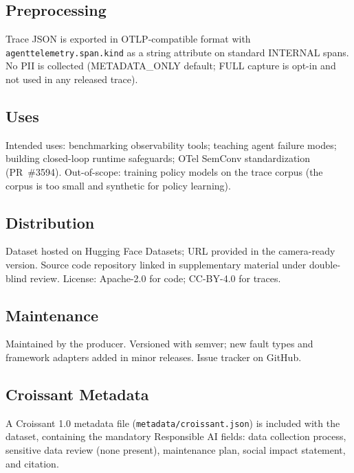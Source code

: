 \documentclass{article}
\begin{document}
\subsection*{Preprocessing}
Trace JSON is exported in OTLP-compatible format with
\texttt{agenttelemetry.span.kind} as a string attribute on standard
INTERNAL spans.  No PII is collected (METADATA\_ONLY default; FULL
capture is opt-in and not used in any released trace).

\subsection*{Uses}
Intended uses: benchmarking observability tools; teaching agent
failure modes; building closed-loop runtime safeguards; OTel
SemConv standardization (PR~\#3594).
Out-of-scope: training policy models on the trace corpus (the corpus
is too small and synthetic for policy learning).

\subsection*{Distribution}
Dataset hosted on Hugging Face Datasets; URL provided in the
camera-ready version.  Source code repository linked in supplementary
material under double-blind review.  License: Apache-2.0 for code;
CC-BY-4.0 for traces.

\subsection*{Maintenance}
Maintained by the producer.  Versioned with semver; new fault types and
framework adapters added in minor releases.  Issue tracker on GitHub.

\subsection*{Croissant Metadata}
A Croissant 1.0 metadata file (\texttt{metadata/croissant.json}) is
included with the dataset, containing the mandatory Responsible AI
fields: data collection process, sensitive data review (none present),
maintenance plan, social impact statement, and citation.


\newpage

\end{document}
